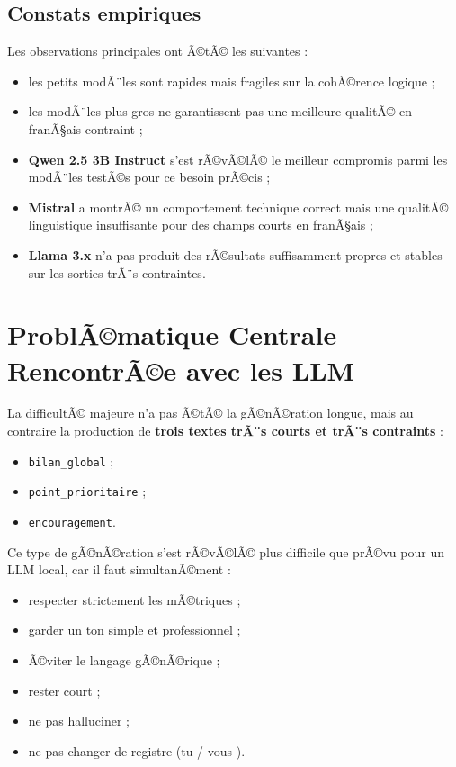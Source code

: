 ﻿\documentclass[12pt,a4paper]{article}
\begin{document}
\subsection{Constats empiriques}
Les observations principales ont Ã©tÃ© les suivantes :
\begin{itemize}
    \item les petits modÃ¨les sont rapides mais fragiles sur la cohÃ©rence logique ;
    \item les modÃ¨les plus gros ne garantissent pas une meilleure qualitÃ© en franÃ§ais contraint ;
    \item \textbf{Qwen 2.5 3B Instruct} s'est rÃ©vÃ©lÃ© le meilleur compromis parmi les modÃ¨les testÃ©s pour ce besoin prÃ©cis ;
    \item \textbf{Mistral} a montrÃ© un comportement technique correct mais une qualitÃ© linguistique insuffisante pour des champs courts en franÃ§ais ;
    \item \textbf{Llama 3.x} n'a pas produit des rÃ©sultats suffisamment propres et stables sur les sorties trÃ¨s contraintes.
\end{itemize}

\section{ProblÃ©matique Centrale RencontrÃ©e avec les LLM}
La difficultÃ© majeure n'a pas Ã©tÃ© la gÃ©nÃ©ration longue, mais au contraire la production de \textbf{trois textes trÃ¨s courts et trÃ¨s contraints} :
\begin{itemize}
    \item \texttt{bilan\_global} ;
    \item \texttt{point\_prioritaire} ;
    \item \texttt{encouragement}.
\end{itemize}

Ce type de gÃ©nÃ©ration s'est rÃ©vÃ©lÃ© plus difficile que prÃ©vu pour un LLM local, car il faut simultanÃ©ment :
\begin{itemize}
    \item respecter strictement les mÃ©triques ;
    \item garder un ton simple et professionnel ;
    \item Ã©viter le langage gÃ©nÃ©rique ;
    \item rester court ;
    \item ne pas halluciner ;
    \item ne pas changer de registre (\og tu \fg{} / \og vous \fg{}).
\end{itemize}
\end{document}
